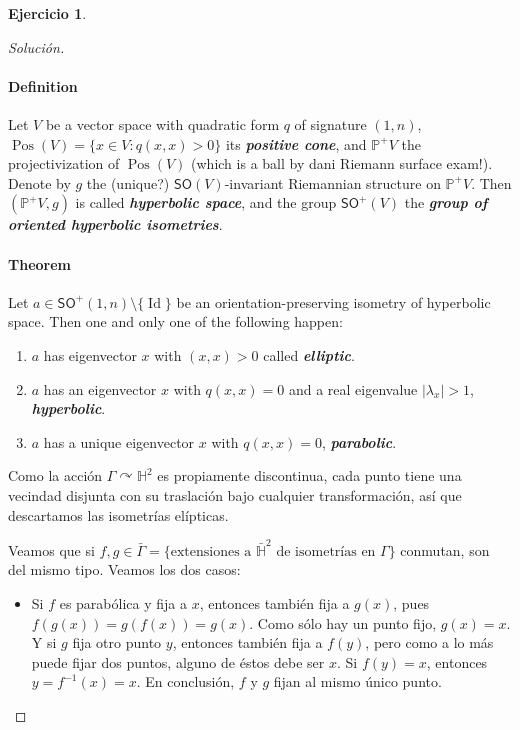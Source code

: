 \documentclass[spanish]{article}
\theoremstyle{definition}
\newtheorem*{ejer*}{Ejercicio}
\newcommand{\Hy}{\mathbb{H}}
\begin{document}
\begin{ejer*}
\begin{proof}[Solución]
		\paragraph{Definition} Let $V$ be a vector space with quadratic form $q$ of signature $(1,n)$, $\operatorname{Pos}(V)=\{x\in V:q(x,x)>0\}$ its \textit{\textbf{positive cone}}, and $\mathbb{P}^+V$ the projectivization of $\operatorname{Pos}(V)$ (which is a ball by dani Riemann surface exam!). Denote by $g$ the (unique?) $\mathsf{SO}(V)$-invariant Riemannian structure on $\mathbb{P}^+V$. Then $(\mathbb{P}^+V,g)$ is called \textit{\textbf{hyperbolic space}}, and the group  $\mathsf{SO}^+(V)$ the \textit{\textbf{group of oriented hyperbolic isometries}}.

		\paragraph{Theorem} Let $ a\in \mathsf{SO}^+(1,n)\setminus\{\operatorname{Id}\}$ be an orientation-preserving isometry of hyperbolic space. Then one and only one of the following happen:
		\begin{enumerate}[label=(\roman*)]
		\item $a$ has eigenvector $x$ with $(x,x)>0$ called  \textit{\textbf{elliptic}}.
		\item $a$ has an eigenvector $x$ with $q(x,x)=0$ and a real eigenvalue  $|\lambda_x|>1$, \textit{\textbf{hyperbolic}}.
		 \item $a$ has a unique eigenvector $x$ with $q(x,x)=0$,  \textit{\textbf{parabolic}}.
		\end{enumerate}


			Como la acción $\Gamma\curvearrowright\Hy^2$ es propiamente discontinua, cada punto tiene una vecindad disjunta con su traslación bajo cualquier transformación, así que descartamos las isometrías elípticas.
			
			Veamos que si $f,g\in\bar{\Gamma}=\{\text{extensiones a }\bar{\Hy}^2\text{ de isometrías en }\Gamma\}$ conmutan, son del mismo tipo. Veamos los dos casos:
			
			\begin{itemize}
				\item Si $f$ es parabólica y fija a $x$, entonces también fija a $g(x)$, pues $f(g(x))=g(f(x))=g(x)$. Como sólo hay un punto fijo, $g(x)=x$. Y si $g$ fija otro punto $y$, entonces también fija a $f(y)$, pero como a lo más puede fijar dos puntos, alguno de éstos debe ser $x$. Si $f(y)=x$, entonces $y=f^{-1}(x)=x$. En conclusión, $f$ y $g$ fijan al mismo único punto.
				

\end{itemize}
\end{proof}
\end{ejer*}
\end{document}
